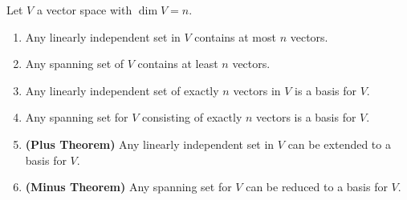 \begin{theorem}
	Let $V$ a vector space with $\dim V = n$. \begin{enumerate}
		\item Any linearly independent set in $V$ contains at most $n$ vectors.
		\item Any spanning set of $V$ contains at least $n$ vectors.
		\item Any linearly independent set of exactly $n$ vectors in $V$ is a basis for $V$.
		\item Any spanning set for $V$ consisting of exactly $n$ vectors is a basis for $V$.
		\item \textbf{(Plus Theorem)} Any linearly independent set in $V$ can be extended to a basis for $V$.
		\item \textbf{(Minus Theorem)} Any spanning set for $V$ can be reduced to a basis for $V$.
	\end{enumerate}
\end{theorem}


